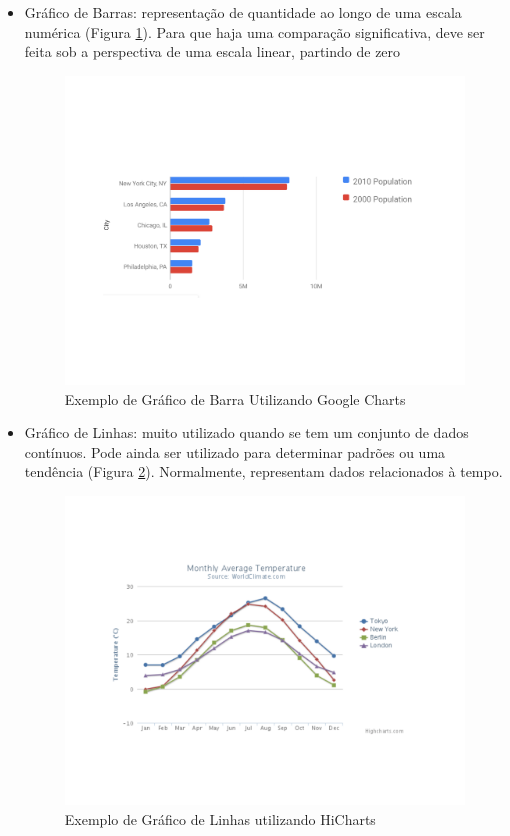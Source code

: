\begin{itemize}

\item Gráfico de Barras: representação de quantidade ao longo de uma escala numérica (Figura \ref{img:bar_graph}). Para que haja uma comparação significativa, deve ser feita sob a perspectiva de uma escala linear, partindo de zero\cite{doumont_choosing_2002}
\graphicspath{{figuras/}}
\begin{figure}[H]
\centering
\includegraphics[scale=0.40]{chart_bar}
\caption{Exemplo de Gráfico de Barra Utilizando Google Charts}
\label{img:bar_graph}
\end{figure}

\item Gráfico de Linhas: muito utilizado quando se tem um conjunto de dados contínuos. Pode ainda ser utilizado para determinar padrões ou uma tendência (Figura \ref{img:line_graph}). Normalmente, representam dados relacionados à tempo.
\graphicspath{{figuras/}}
\begin{figure}[H]
\centering
\includegraphics[scale=0.40]{line_chart}
\caption{Exemplo de Gráfico de Linhas utilizando HiCharts}
\label{img:line_graph}
\end{figure}


\end{itemize}
